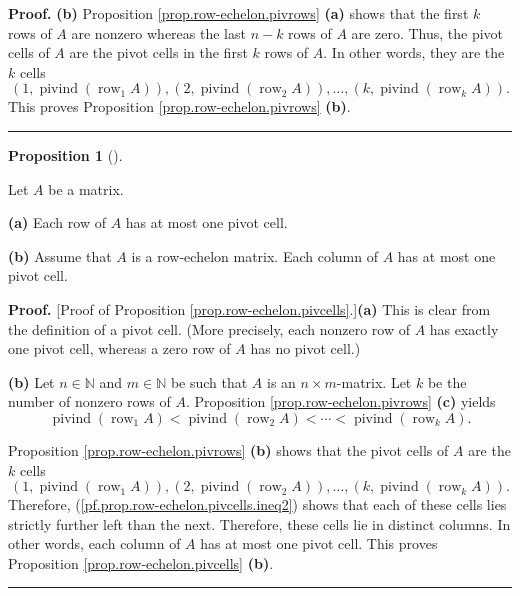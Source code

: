 \documentclass[numbers=enddot,12pt,final,onecolumn,notitlepage]{scrartcl}%
\theoremstyle{definition}
\newtheorem{prop}[theo]{Proposition}
\newenvironment{proposition}[1][]
{\begin{prop}[#1]\begin{leftbar}}
{\end{leftbar}\end{prop}}
\newenvironment{proof}[1][Proof]{\noindent\textbf{#1.} }{\ \rule{0.5em}{0.5em}}
\begin{document}
\begin{proof}
\textbf{(b)} Proposition \ref{prop.row-echelon.pivrows} \textbf{(a)} shows
that the first $k$ rows of $A$ are nonzero whereas the last $n-k$ rows of $A$
are zero. Thus, the pivot cells of $A$ are the pivot cells in the first $k$
rows of $A$. In other words, they are the $k$ cells
\[
\left(  1,\operatorname*{pivind}\left(  \operatorname*{row}\nolimits_{1}%
A\right)  \right)  ,\left(  2,\operatorname*{pivind}\left(
\operatorname*{row}\nolimits_{2}A\right)  \right)  ,\ldots,\left(
k,\operatorname*{pivind}\left(  \operatorname*{row}\nolimits_{k}A\right)
\right)  .
\]
This proves Proposition \ref{prop.row-echelon.pivrows} \textbf{(b)}.
\end{proof}

\begin{proposition}
\label{prop.row-echelon.pivcells}Let $A$ be a matrix.

\textbf{(a)} Each row of $A$ has at most one pivot cell.

\textbf{(b)} Assume that $A$ is a row-echelon matrix. Each column of $A$ has
at most one pivot cell.
\end{proposition}

\begin{proof}
[Proof of Proposition \ref{prop.row-echelon.pivcells}.]\textbf{(a)} This is
clear from the definition of a pivot cell. (More precisely, each nonzero row
of $A$ has exactly one pivot cell, whereas a zero row of $A$ has no pivot cell.)

\textbf{(b)} Let $n\in\mathbb{N}$ and $m\in\mathbb{N}$ be such that $A$ is an
$n\times m$-matrix. Let $k$ be the number of nonzero rows of $A$. Proposition
\ref{prop.row-echelon.pivrows} \textbf{(c)} yields%
\begin{equation}
\operatorname*{pivind}\left(  \operatorname*{row}\nolimits_{1}A\right)
<\operatorname*{pivind}\left(  \operatorname*{row}\nolimits_{2}A\right)
<\cdots<\operatorname*{pivind}\left(  \operatorname*{row}\nolimits_{k}%
A\right)  . \label{pf.prop.row-echelon.pivcells.ineq2}%
\end{equation}


Proposition \ref{prop.row-echelon.pivrows} \textbf{(b)} shows that the pivot
cells of $A$ are the $k$ cells
\[
\left(  1,\operatorname*{pivind}\left(  \operatorname*{row}\nolimits_{1}%
A\right)  \right)  ,\left(  2,\operatorname*{pivind}\left(
\operatorname*{row}\nolimits_{2}A\right)  \right)  ,\ldots,\left(
k,\operatorname*{pivind}\left(  \operatorname*{row}\nolimits_{k}A\right)
\right)  .
\]
Therefore, (\ref{pf.prop.row-echelon.pivcells.ineq2}) shows that each of these
cells lies strictly further left than the next. Therefore, these cells lie in
distinct columns. In other words, each column of $A$ has at most one pivot
cell. This proves Proposition \ref{prop.row-echelon.pivcells} \textbf{(b)}.
\end{proof}
\end{document}
